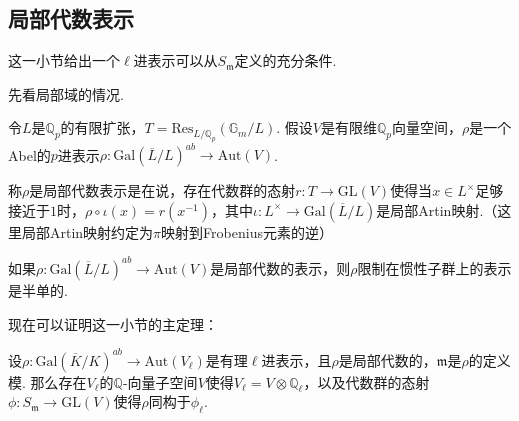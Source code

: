 \subsection{局部代数表示}

这一小节给出一个$\ell$进表示可以从$S_{\mathfrak{m}}$定义的充分条件.

先看局部域的情况.

令$L$是$\mathbb{Q}_p$的有限扩张，$T = \mathrm{Res}_{L/\mathbb{Q}_p}(\mathbb{G}_m / L)$.
假设$V$是有限维$\mathbb{Q}_p$向量空间，$\rho$是一个Abel的$p$进表示$\rho: \mathrm{Gal}(\overline{L}/L)^{ab} \to \mathrm{Aut}(V)$.

\begin{cdef}
    称$\rho$是局部代数表示是在说，存在代数群的态射$r:T\to \mathrm{GL}(V)$使得当$x\in L^{\times}$足够接近于$1$时，$\rho\circ \iota(x) = r(x^{-1})$，其中$\iota: L^{\times}\to \mathrm{Gal}(\overline{L}/L) $是局部Artin映射.（这里局部Artin映射约定为$\pi$映射到Frobenius元素的逆）
\end{cdef}

\begin{cprop}
    如果$\rho: \mathrm{Gal}(\overline{L}/L)^{ab} \to \mathrm{Aut}(V)$是局部代数的表示，则$\rho$限制在惯性子群上的表示是半单的.
\end{cprop}



现在可以证明这一小节的主定理：

\begin{cthm}
    设$\rho: \mathrm{Gal}(\overline{K}/K)^{ab} \to \mathrm{Aut}(V_{\ell})$是有理$\ell$进表示，且$\rho$是局部代数的，$\mathfrak{m}$是$\rho$的定义模. 那么存在$V_{\ell}$的$\mathbb{Q}$-向量子空间$V$使得$V_{\ell} = V\otimes \mathbb{Q}_{\ell}$，以及代数群的态射$\phi: S_{\mathfrak{m}}\to \mathrm{GL}(V)$使得$\rho$同构于$\phi_{\ell}$.
\end{cthm}
